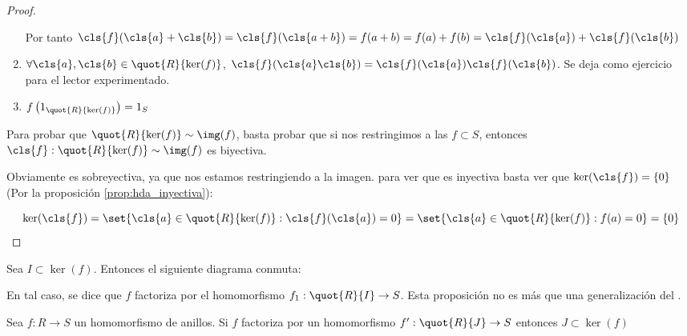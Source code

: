 \begin{proof}
\begin{enumerate}
	Por tanto $\cls{f}(\cls{a}+\cls{b})=\cls{f}(\cls{a+b}) = f(a+b) = f(a)+f(b) = \cls{f}(\cls{a})+\cls{f}(\cls{b})$
	\item $\forall \cls{a},\cls{b} \in \quot{R}{\ker (f)}$, $\cls{f}(\cls{a}\cls{b})=\cls{f}(\cls{a})\cls{f}(\cls{b})$. Se deja como ejercicio para el lector experimentado.
	\item $f\left(1_{\quot{R}{\ker (f)}}\right)=1_{S}$
\end{enumerate}

Para probar que $\quot{R}{\ker (f)} \sim \img (f)$, basta probar que si nos restringimos a las $f \subset S$, entonces $\cls{f}:\quot{R}{\ker (f)} \sim \img (f)$ es biyectiva.

Obviamente es sobreyectiva, ya que nos estamos restringiendo a la imagen. para ver que es inyectiva basta ver que $\ker(\cls{f})=\{0\}$ (Por la proposición \ref{prop:hda_inyectiva}):

$$ \ker(\cls{f})=\set{ \cls{a} \in \quot{R}{\ker (f)}: \cls{f}(\cls{a})=0 } = \set{ \cls{a}\in \quot{R}{\ker (f)}: f(a)=0 } = \{0\} $$
\end{proof}

\begin{prop} \label{prop:FactorizacionHomomorfismo}
Sea $I \subset \ker (f)$. Entonces el siguiente diagrama conmuta:

\begin{center}
\end{center}

En tal caso, se dice que $f$ factoriza por el homomorfismo $f_1: \quot{R}{I} \rightarrow S$. Esta proposición no es más que una generalización del .
\end{prop}


\begin{prop} \label{prop:FactorizacionHomomorfismo2}
	Sea $f: R \rightarrow S$ un homomorfismo de anillos. Si $f$ factoriza por un homomorfismo $f':\quot{R}{J} \rightarrow S$ entonces $J \subset \ker (f)$
\end{prop}

